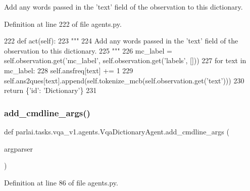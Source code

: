 \begin{DoxyVerb}Add any words passed in the 'text' field of the observation to this dictionary.
\end{DoxyVerb}
 

Definition at line 222 of file agents.\+py.


\begin{DoxyCode}
222     \textcolor{keyword}{def }act(self):
223         \textcolor{stringliteral}{"""}
224 \textcolor{stringliteral}{        Add any words passed in the 'text' field of the observation to this dictionary.}
225 \textcolor{stringliteral}{        """}
226         mc\_label = self.observation.get(\textcolor{stringliteral}{'mc\_label'}, self.observation.get(\textcolor{stringliteral}{'labels'}, []))
227         \textcolor{keywordflow}{for} text \textcolor{keywordflow}{in} mc\_label:
228             self.ansfreq[text] += 1
229             self.ans2ques[text].append(self.tokenize\_mcb(self.observation.get(\textcolor{stringliteral}{'text'})))
230         \textcolor{keywordflow}{return} \{\textcolor{stringliteral}{'id'}: \textcolor{stringliteral}{'Dictionary'}\}
231 
\end{DoxyCode}
\mbox{\label{classparlai_1_1tasks_1_1vqa__v1_1_1agents_1_1VqaDictionaryAgent_a77cb7a0b3e0fbbec04905a9745f95dd7}} 
\subsubsection{\texorpdfstring{add\+\_\+cmdline\+\_\+args()}{add\_cmdline\_args()}}
{\footnotesize\ttfamily def parlai.\+tasks.\+vqa\+\_\+v1.\+agents.\+Vqa\+Dictionary\+Agent.\+add\+\_\+cmdline\+\_\+args (\begin{DoxyParamCaption}\item[{}]{argparser }\end{DoxyParamCaption})\hspace{0.3cm}{\ttfamily [static]}}



Definition at line 86 of file agents.\+py.


